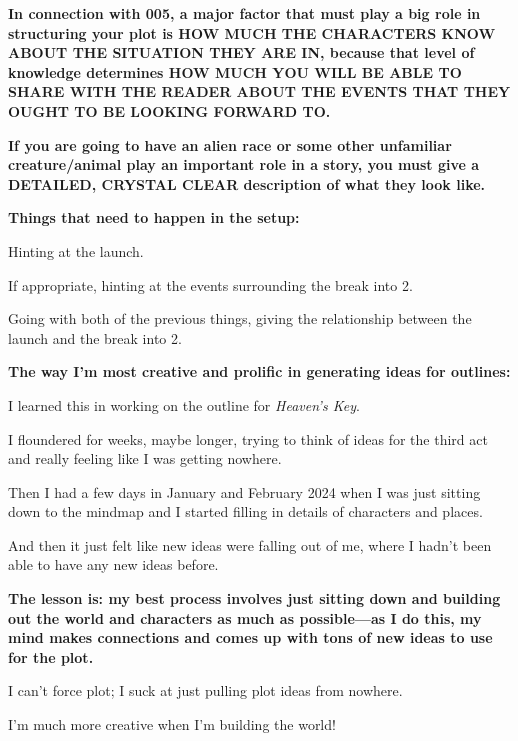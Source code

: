 \begin{compactdesc}
		\item[\tr{006}] \textbf{In connection with 005, a major factor that must play a big role in structuring your plot is HOW MUCH THE CHARACTERS KNOW ABOUT THE SITUATION THEY ARE IN, because that level of knowledge determines HOW MUCH YOU WILL BE ABLE TO SHARE WITH THE READER ABOUT THE EVENTS THAT THEY OUGHT TO BE LOOKING FORWARD TO.}
		
		\item[\tr{007}] \textbf{If you are going to have an alien race or some other unfamiliar creature/animal play an important role in a story, you must give a DETAILED, CRYSTAL CLEAR description of what they look like.}
		
		\item[\tr{008}] \textbf{Things that need to happen in the setup:}
			\begin{compactitem}
				\item Hinting at the launch.
				\item If appropriate, hinting at the events surrounding the break into 2.
				\item Going with both of the previous things, giving the relationship between the launch and the break into 2.
			\end{compactitem}
			
		\item[\tr{009}] \textbf{The way I'm most creative and prolific in generating ideas for outlines:}
			\begin{compactitem}
				\item I learned this in working on the outline for \textit{Heaven's Key}.
				\item I floundered for weeks, maybe longer, trying to think of ideas for the third act and really feeling like I was getting nowhere.
				\item Then I had a few days in January and February 2024 when I was just sitting down to the mindmap and I started filling in details of characters and places.
				\item And then it just felt like new ideas were falling out of me, where I hadn't been able to have any new ideas before.
				\item \textbf{The lesson is: my best process involves just sitting down and building out the world and characters as much as possible---as I do this, my mind makes connections and comes up with tons of new ideas to use for the plot.}
				\item I can't force plot; I suck at just pulling plot ideas from nowhere.
				\item I'm much more creative when I'm building the world!
			\end{compactitem}
			

\end{compactdesc}
